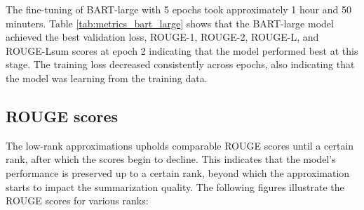 \begin{table}[H]
    \centering
    \caption{Training and Validation Metrics of Fine-Tuning BART-large across Epochs}
    \label{tab:metrics_bart_large}
    \end{table}

    The fine-tuning of BART-large with 5 epochs took approximately 1 hour and 50 minuters. Table \ref{tab:metrics_bart_large} shows that the BART-large model achieved the best validation loss, ROUGE-1, ROUGE-2, ROUGE-L, and ROUGE-Lsum scores at epoch 2 indicating that the model performed best at this stage. The training loss decreased consistently across epochs, also indicating that the model was learning from the training data.

\subsection{ROUGE scores} The low-rank approximations upholds comparable ROUGE scores until a certain rank, after which the scores begin to decline. This indicates that the model's performance is preserved up to a certain rank, beyond which the approximation starts to impact the summarization quality. The following figures illustrate the ROUGE scores for various ranks:

